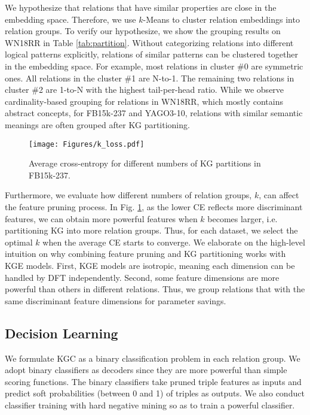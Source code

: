 \documentclass{article}
\begin{document}
We hypothesize that relations that have similar properties are close in the 
embedding space. Therefore, we use $k$-Means to cluster relation embeddings
into relation groups. To verify our hypothesize, we show the grouping results on
WN18RR in Table \ref{tab:partition}. Without categorizing relations into 
different logical patterns explicitly, relations of similar patterns can be 
clustered together in the embedding space. For example, most
relations in cluster \#0 are symmetric ones. All relations in the cluster
\#1 are N-to-1. The remaining two relations in cluster \#2 are 1-to-N
with the highest tail-per-head ratio. While we observe cardinality-based
grouping for relations in WN18RR, which mostly contains abstract concepts, 
for FB15k-237 and YAGO3-10, relations with similar semantic 
meanings are often grouped after KG partitioning.


\begin{figure}[t]
\centering
\texttt{[image: Figures/k\_loss.pdf]} \\
\caption{Average cross-entropy for different numbers of KG partitions
in FB15k-237.}\label{fig:avg_ce}
\end{figure}


Furthermore, we evaluate how different numbers of relation groups, $k$, can affect the feature 
pruning process. In Fig. \ref{fig:avg_ce}, as the lower CE reflects more 
discriminant features, we can obtain more powerful features when $k$ becomes larger, i.e. 
partitioning KG into more relation groups. 
Thus, for each dataset, we select the optimal $k$ when the average CE starts to converge. We 
elaborate on the high-level intuition on why combining feature pruning and KG partitioning 
works with KGE models. First, KGE models are isotropic, meaning each dimension can be handled 
by DFT independently. Second, some feature dimensions are more powerful than others in 
different relations. Thus, we group relations that with the same discriminant feature 
dimensions for parameter savings.



\subsection{Decision Learning}\label{subsec:decision}

We formulate KGC as a binary classification problem in each
relation group. We adopt binary classifiers as decoders since they are
more powerful than simple scoring functions. The binary
classifiers take pruned triple features as inputs and predict
soft probabilities (between 0 and 1) of triples as outputs. We also
conduct classifier training with hard negative mining so as to train a
powerful classifier. 
\end{document}
